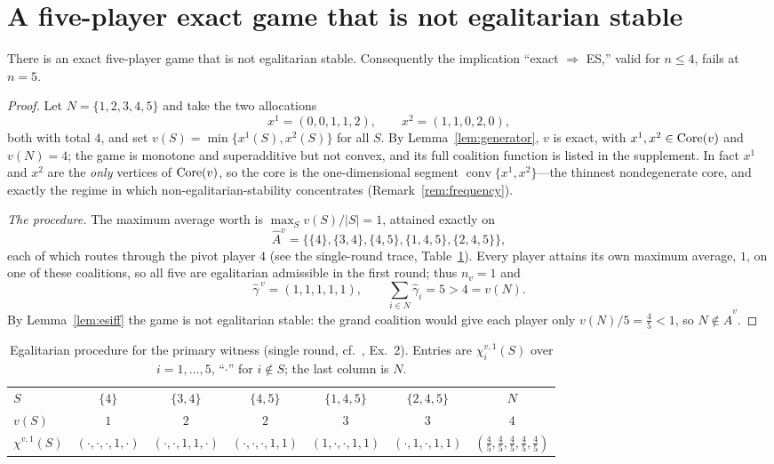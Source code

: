\section{A five-player exact game that is not egalitarian stable}
\label{sec:witness}

\begin{theorem}\label{thm:witness}
There is an exact five-player game that is not egalitarian stable. Consequently
the implication ``exact $\Rightarrow$ ES,'' valid for $n\le4$, fails at $n=5$.
\end{theorem}

\begin{proof}
Let $N=\{1,2,3,4,5\}$ and take the two allocations
\[
  x^{1}=(0,0,1,1,2),\qquad x^{2}=(1,1,0,2,0),
\]
both with total $4$, and set $v(S)=\min\{x^{1}(S),x^{2}(S)\}$ for all $S$. By
Lemma~\ref{lem:generator}, $v$ is exact, with $x^{1},x^{2}\in\operatorname{Core}(v)$ and
$v(N)=4$; the game is monotone and superadditive but not convex, and its full
coalition function is listed in the supplement. In fact $x^{1}$ and $x^{2}$ are
the \emph{only} vertices of $\operatorname{Core}(v)$, so the core is the one-dimensional
segment $\operatorname{conv}\{x^{1},x^{2}\}$---the thinnest nondegenerate core,
and exactly the regime in which non-egalitarian-stability concentrates
(Remark~\ref{rem:frequency}).

\emph{The procedure.} The maximum average worth is
$\max_{S}v(S)/\lvert S\rvert=1$, attained exactly on
\[
  \widehat A^{v}=\bigl\{\{4\},\{3,4\},\{4,5\},\{1,4,5\},\{2,4,5\}\bigr\},
\]
each of which routes through the pivot player $4$ (see the single-round trace,
Table~\ref{tab:trace}). Every player attains its own maximum average, $1$, on one
of these coalitions, so all five are egalitarian admissible in the first round;
thus $n_v=1$ and
\[
  \widehat\gamma^{\,v}=(1,1,1,1,1),\qquad \sum_{i\in N}\widehat\gamma_i=5>4=v(N).
\]
By Lemma~\ref{lem:esiff} the game is not egalitarian stable: the grand coalition
would give each player only $v(N)/5=\tfrac45<1$, so $N\notin\widehat A^{v}$.
\end{proof}

\begin{table}[t]
\centering
\caption{Egalitarian procedure for the primary witness (single round, cf.\
\citealp{Dietzenbacher2021}, Ex.~2). Entries are $\chi^{v,1}_i(S)$ over
$i=1,\dots,5$, ``$\cdot$'' for $i\notin S$; the last column is $N$.}
\label{tab:trace}
\begin{tabular}{lcccccc}
\toprule
$S$ & $\{4\}$ & $\{3,4\}$ & $\{4,5\}$ & $\{1,4,5\}$ & $\{2,4,5\}$ & $N$\\
$v(S)$ & $1$ & $2$ & $2$ & $3$ & $3$ & $4$\\
\midrule
$\chi^{v,1}(S)$
 & $(\cdot,\cdot,\cdot,1,\cdot)$
 & $(\cdot,\cdot,1,1,\cdot)$
 & $(\cdot,\cdot,\cdot,1,1)$
 & $(1,\cdot,\cdot,1,1)$
 & $(\cdot,1,\cdot,1,1)$
 & $(\tfrac45,\tfrac45,\tfrac45,\tfrac45,\tfrac45)$\\
\bottomrule
\end{tabular}
\end{table}

